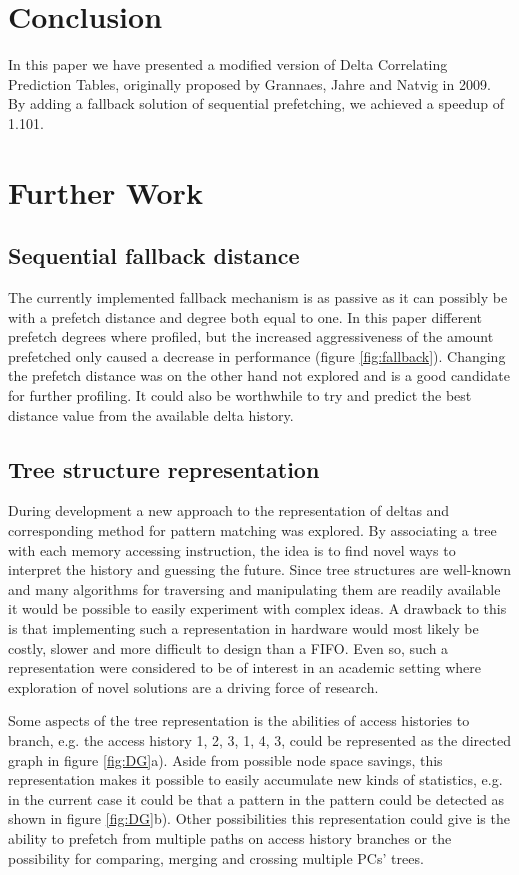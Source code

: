 \documentclass[12pt,journal,compsoc]{IEEEtran}
\begin{document}
\section{Conclusion}
In this paper we have presented a modified version of Delta Correlating
Prediction Tables, originally proposed by Grannaes, Jahre and Natvig in 2009.
\cite{dcptpaper} By adding a fallback solution of sequential prefetching,
we achieved a speedup of 1.101.

\section{Further Work}

\subsection{Sequential fallback distance}
The currently implemented fallback mechanism is as passive
as it can possibly be with a prefetch distance and degree both equal
to one. In this paper different prefetch degrees where profiled, but
the increased aggressiveness of the amount prefetched only caused a
decrease in performance (figure \ref{fig:fallback}). Changing the prefetch
distance
was on the other hand not explored and is a good candidate for further
profiling. It could also be worthwhile to try and predict the best distance
value from the available delta history.

\subsection{Tree structure representation}
During development a new approach to the representation of deltas
and corresponding method for pattern matching was explored. By associating
a tree with each memory accessing instruction, the idea is to find novel ways
to interpret the history and guessing the future. Since tree structures
are well-known and many algorithms for traversing and manipulating them
are readily available it would be possible to easily experiment
with complex ideas. A drawback to this is that implementing such a
representation in hardware would most likely be costly, slower
and more difficult to design than a FIFO. Even so, such a
representation were considered to be of interest in an academic
setting where exploration of novel solutions are a driving force of
research.

Some aspects of the tree representation is the abilities of access histories
to branch, e.g. the access history 1, 2, 3, 1, 4, 3, could be represented
as the directed graph in figure \ref{fig:DG}a).
Aside from possible node space savings, this representation makes it
possible to easily accumulate new kinds of statistics, e.g. in the
current case it could be that a pattern in the pattern could be
detected as shown in figure \ref{fig:DG}b). Other possibilities this
representation could give is the ability to prefetch from multiple
paths on access history branches or the possibility for comparing,
merging and crossing multiple PCs' trees.
\end{document}

